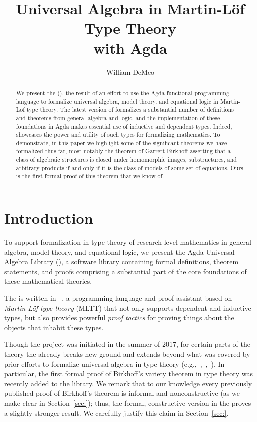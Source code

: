\documentclass[a4paper,UKenglish,cleveref, autoref, thm-restate]{lipics-v2019}
\title{Universal Algebra in Martin-L\"of Type Theory\\ with Agda} %
\author{William DeMeo}{Department of Algebra, Faculty of Mathematics and Physics, Charles University, Prague}{Czech Republic}{https://orcid.org/0000-0003-1832-5690}{}
\begin{document}
\maketitle

\begin{abstract}
We present the \AgdaUALib (\agdaualib), the result of an effort to use the Agda functional programming language to formalize universal algebra, model theory, and equational logic in Martin-L\"of type theory.
The latest version of \agdaualib formalizes a substantial number of definitions and theorems from general algebra and logic, and the implementation of these foundations in Agda makes essential use of inductive and dependent types. Indeed, \agdaualib showcases the power and utility of such types for formalizing mathematics.  To demonstrate, in this paper we highlight some of the significant theorems we have formalized thus far, most notably the theorem of Garrett Birkhoff asserting that a class of algebraic structures is closed under homomorphic images, substructures, and arbitrary products if and only if it is the class of models of some set of equations. Ours is the first formal proof of this theorem that we know of.
\end{abstract}

\section{Introduction}\label{sec:introduction}
To support formalization in type theory of research level mathematics in general algebra, model theory, and equational logic, we present the Agda Universal Algebra Library (\agdaualib), a software library containing formal definitions, theorem statements, and proofs comprising a substantial part of the core foundations of these mathematical theories.

The \agdaualib is written in \agda~\cite{Norell:2009}, a programming language and proof assistant based on \textit{Martin-L\"of type theory} (MLTT) that not only supports dependent and inductive types, but also provides powerful \emph{proof tactics} for proving things about the objects that inhabit these types.

Though the project was initiated in the summer of 2017, for certain parts of the theory the \agdaualib already breaks new ground and extends beyond what was covered by prior efforts to formalize universal algebra in type theory (e.g.,~\cite{Gunther:2018},~\cite{Spitters:2011},~\cite{Capretta:1999}). In particular, the first formal proof of Birkhoff's variety theorem in type theory was recently added to the library. We remark that to our knowledge every previously published proof of Birkhoff's theorem is informal and nonconstructive (as we make clear in Section~\ref{sec:}); thus, the formal, constructive version in the \agdaualib proves a slightly stronger result. We carefully justify this claim in Section~\ref{sec:}.
\end{document}
